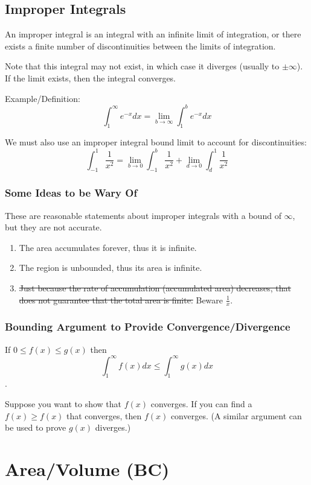 \documentclass{article}
\begin{document}
\subsection{Improper Integrals}
An improper integral is an integral with an infinite limit of integration, or there exists a finite number of discontinuities between the limits of integration.

Note that this integral may not exist, in which case it diverges (usually to $\pm \infty$). If the limit exists, then the integral converges.

Example/Definition:
$$\int_{1}^{\infty} e^{-x} dx = \lim_{b \to \infty} \int_{1}^{b} e^{-x} dx $$

We must also use an improper integral bound limit to account for discontinuities:
$$\int_{-1}^{1} \frac{1}{x^2} = \lim_{b \to 0} \int_{-1}^{b} \frac{1}{x^2} + \lim_{d \to 0} \int_{d}^{1} \frac{1}{x^2} $$

\subsubsection{Some Ideas to be Wary Of}
These are reasonable statements about improper integrals with a bound of $\infty$, but they are not accurate.

\begin{enumerate}
    \item The area accumulates forever, thus it is infinite.
    \item The region is unbounded, thus its area is infinite.
    \item \st{Just because the rate of accumulation (accumulated area) decreases, that does not guarantee that the total area is finite.} Beware $\frac{1}{x}$.
\end{enumerate}

\subsubsection{Bounding Argument to Provide Convergence/Divergence}
If $0 \le f(x) \le g(x)$ then $$\int_{1}^{\infty} f(x) dx \le \int_{1}^{\infty} g(x) dx$$.

Suppose you want to show that $f(x)$ converges. If you can find a $f(x) \ge f(x)$ that converges, then $f(x)$ converges. (A similar argument can be used to prove $g(x)$ diverges.)

\section{Area/Volume (BC)}
\end{document}

